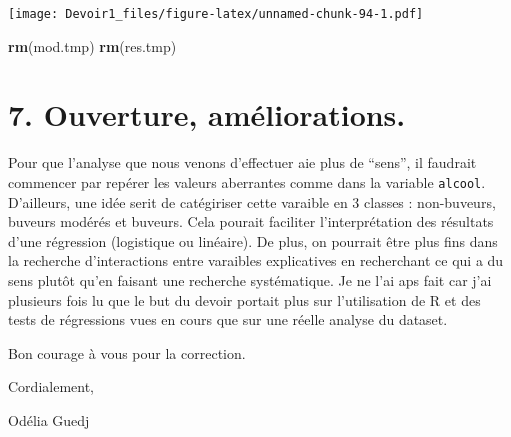 \documentclass[]{article}
\newenvironment{Shaded}{\begin{snugshade}}{\end{snugshade}}
\newcommand{\KeywordTok}[1]{\textcolor[rgb]{0.13,0.29,0.53}{\textbf{#1}}}
\newcommand{\NormalTok}[1]{#1}
\begin{document}
\texttt{[image: Devoir1\_files/figure-latex/unnamed-chunk-94-1.pdf]}

\begin{Shaded}
\begin{Highlighting}[]
\KeywordTok{rm}\NormalTok{(mod.tmp)}
\KeywordTok{rm}\NormalTok{(res.tmp)}
\end{Highlighting}
\end{Shaded}

\section{7. Ouverture,
améliorations.}\label{ouverture-amuxe9liorations.}

Pour que l'analyse que nous venons d'effectuer aie plus de ``sens'', il
faudrait commencer par repérer les valeurs aberrantes comme dans la
variable \texttt{alcool}. D'ailleurs, une idée serit de catégiriser
cette varaible en 3 classes : non-buveurs, buveurs modérés et buveurs.
Cela pourait faciliter l'interprétation des résultats d'une régression
(logistique ou linéaire). De plus, on pourrait être plus fins dans la
recherche d'interactions entre varaibles explicatives en recherchant ce
qui a du sens plutôt qu'en faisant une recherche systématique. Je ne
l'ai aps fait car j'ai plusieurs fois lu que le but du devoir portait
plus sur l'utilisation de R et des tests de régressions vues en cours
que sur une réelle analyse du dataset.

Bon courage à vous pour la correction.

Cordialement,

Odélia Guedj
\end{document}
